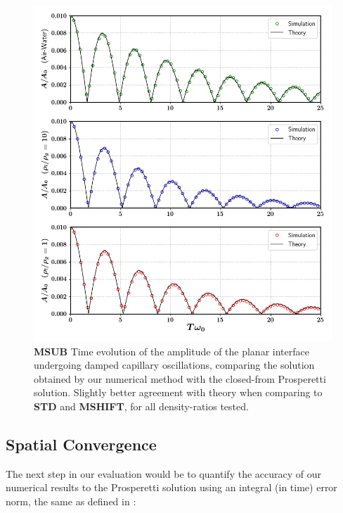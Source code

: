 \begin{figure}[h!]
    \centering
    \includegraphics[width = 1.0\textwidth]{plots/capwave/compare_sagar.png}
	\caption{\textbf{MSUB} Time evolution of the amplitude of the planar interface undergoing damped capillary oscillations, comparing the solution obtained by our numerical method with the closed-from Prosperetti solution. Slightly better agreement with theory when comparing to \textbf{STD} and \textbf{MSHIFT}, for all density-ratios tested. }
    \label{capwave_sagar}
\end{figure}


\subsection*{Spatial Convergence}

The next step in our evaluation would be to quantify the accuracy of our numerical results to the Prosperetti solution using an integral (in time) error norm, the same as defined in \cite{popinet2009accurate} :       


